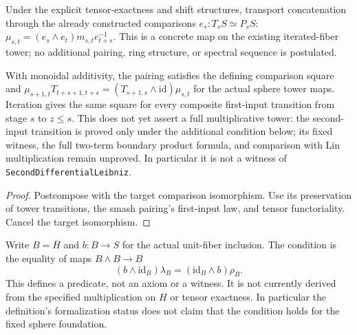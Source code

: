 \begin{definition}
  \label{def:h6-existing-tower-pairing}
  \leanok
  Under the explicit tensor-exactness and shift structures, transport
  concatenation through the already constructed comparisons $e_s:T_sS\simeq P_sS$:
  $\mu_{s,t}=(e_s\wedge e_t)m_{s,t}e_{t+s}^{-1}$.
  This is a concrete map on the existing iterated-fiber tower; no additional
  pairing, ring structure, or spectral sequence is postulated.
\end{definition}

\begin{proposition}
  \label{prop:h6-existing-tower-pairing-left-transition}
  \leanok
  With monoidal additivity, the pairing satisfies the defining comparison
  square and
  $\mu_{s+1,t}T_{t+s+1,t+s}=(T_{s+1,s}\wedge\mathrm{id})\mu_{s,t}$
  for the actual sphere tower maps. Iteration gives the same square for
  every composite first-input transition from stage $s$ to $z\le s$.
  This does not yet assert a full multiplicative tower: the second-input transition is proved only under the
  additional condition below; its fixed witness, the full two-term boundary
  product formula, and comparison with Lin multiplication remain unproved.
  In particular it is not a witness of \texttt{SecondDifferentialLeibniz}.
\end{proposition}
\begin{proof}
  Postcompose with the target comparison isomorphism. Use its preservation
  of tower transitions, the smash pairing's first-input law, and tensor
  functoriality. Cancel the target isomorphism.
  \leanok
\end{proof}

\begin{definition}
  \label{def:h6-unit-fiber-inclusion-commutes}
  \leanok
  Write $B=\overline H$ and $b:B\to S$ for the actual unit-fiber inclusion.
  The condition is the equality of maps $B\wedge B\to B$
  \[
    (b\wedge\mathrm{id}_B)\lambda_B
      =(\mathrm{id}_B\wedge b)\rho_B.
  \]
  This defines a predicate, not an axiom or a witness. It is not currently
  derived from the specified multiplication on $H$ or tensor exactness.
  In particular the definition's formalization status does not claim that
  the condition holds for the fixed sphere foundation.
\end{definition}

